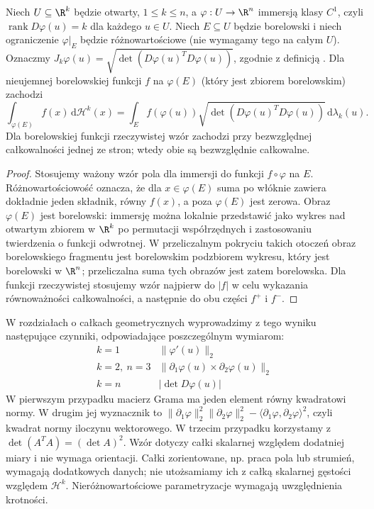\begin{twierdzenie}
\label{ma2:thm:lebesgue-hausdorff-parametric}
Niech $U\subseteq\R^k$ będzie otwarty,
$1\le k\le n$, a $\varphi:U\to\R^n$
immersją klasy $C^1$,
czyli $\operatorname{rank}D\varphi(u)=k$
dla każdego $u\in U$.
Niech $E\subseteq U$ będzie borelowski
i niech ograniczenie $\varphi|_E$ będzie
różnowartościowe (nie wymagamy tego na całym $U$).
Oznaczmy $J_k\varphi(u)=
\sqrt{\det(D\varphi(u)^TD\varphi(u))}$,
zgodnie z definicją
.
Dla nieujemnej borelowskiej funkcji $f$
na $\varphi(E)$ (który jest zbiorem borelowskim)
zachodzi
\[
 \int_{\varphi(E)}f(x)\,\mathrm d\mathcal H^k(x)
 =\int_E f(\varphi(u))
 \sqrt{\det(D\varphi(u)^TD\varphi(u))}
 \,\mathrm d\lambda_k(u).
\]
Dla borelowskiej funkcji rzeczywistej
wzór zachodzi przy bezwzględnej
całkowalności jednej ze stron; wtedy obie
są bezwzględnie całkowalne.
\end{twierdzenie}
\begin{proof}
Stosujemy ważony wzór pola dla immersji
do funkcji $f\circ\varphi$ na $E$.
Różnowartościowość oznacza, że dla
$x\in\varphi(E)$ suma po włóknie
zawiera dokładnie jeden składnik, równy
$f(x)$, a poza $\varphi(E)$ jest zerowa.
Obraz $\varphi(E)$ jest borelowski:
immersję można lokalnie przedstawić
jako wykres nad otwartym zbiorem
w $\R^k$ po permutacji współrzędnych
i zastosowaniu twierdzenia o funkcji odwrotnej.
W przeliczalnym pokryciu takich otoczeń
obraz borelowskiego fragmentu jest
borelowskim podzbiorem wykresu,
który jest borelowski w $\R^n$;
przeliczalna suma tych obrazów
jest zatem borelowska.
Dla funkcji rzeczywistej stosujemy wzór
najpierw do $|f|$ w celu wykazania
równoważności całkowalności, a następnie
do obu części $f^+$ i $f^-$.
\end{proof}

W rozdziałach o całkach geometrycznych
wyprowadzimy z tego wyniku następujące
czynniki, odpowiadające poszczególnym wymiarom:
\[
 \begin{array}{c|c}
 k=1 & \|\varphi'(u)\|_2\\
 k=2,\ n=3 & \|\partial_1\varphi(u)\times
                         \partial_2\varphi(u)\|_2\\
 k=n & |\det D\varphi(u)|
 \end{array}
\]
W pierwszym przypadku macierz Grama ma
jeden element równy kwadratowi normy.
W drugim jej wyznacznik to
$\|\partial_1\varphi\|_2^2\|\partial_2\varphi\|_2^2
-\langle\partial_1\varphi,\partial_2\varphi\rangle^2$,
czyli kwadrat normy iloczynu wektorowego.
W trzecim przypadku korzystamy z
$\det(A^TA)=(\det A)^2$.
Wzór dotyczy całki skalarnej względem
dodatniej miary i nie wymaga orientacji.
Całki zorientowane, np. praca pola lub
strumień, wymagają dodatkowych danych;
nie utożsamiamy ich z całką skalarnej
gęstości względem $\mathcal H^k$.
Nieróżnowartościowe parametryzacje
wymagają uwzględnienia krotności.


